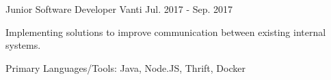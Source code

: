 

\begin{cventries}

  \cventry
    {Junior Software Developer} %
    {Vanti} %
    {} %
    {Jul. 2017 - Sep. 2017} %
    {
      \begin{cvitems} %
        \item {Implementing solutions to improve communication between existing internal systems.}
        \item {Primary Languages/Tools: Java, Node.JS, Thrift, Docker}
      \end{cvitems}
    }



\end{cventries}
